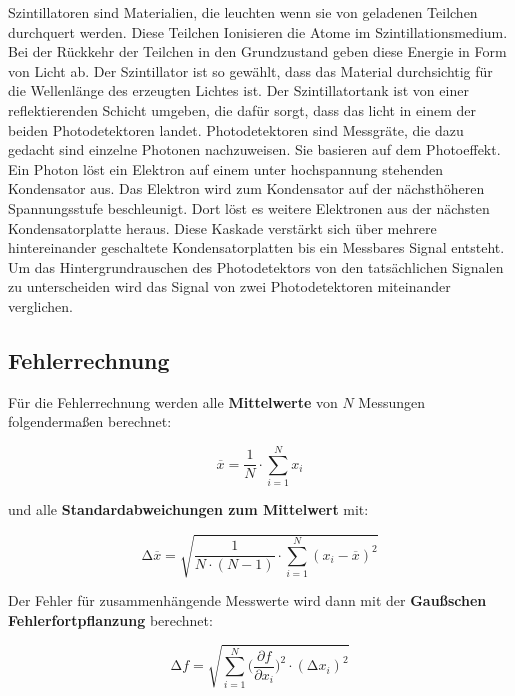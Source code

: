 Szintillatoren sind Materialien, die leuchten wenn sie von geladenen Teilchen durchquert werden.
Diese Teilchen Ionisieren die Atome im Szintillationsmedium. Bei der Rückkehr der Teilchen in den
Grundzustand geben diese Energie in Form von Licht ab. Der Szintillator ist so gewählt, dass das
Material durchsichtig für die Wellenlänge des erzeugten Lichtes ist.
Der Szintillatortank ist von einer reflektierenden Schicht umgeben, die dafür sorgt, dass das licht in
einem der beiden Photodetektoren landet.
Photodetektoren sind Messgräte, die dazu gedacht sind einzelne Photonen nachzuweisen.
Sie basieren auf dem Photoeffekt. Ein Photon löst ein Elektron auf einem unter hochspannung stehenden Kondensator aus.
Das Elektron wird zum Kondensator auf der nächsthöheren Spannungsstufe beschleunigt. Dort löst es weitere Elektronen
aus der nächsten Kondensatorplatte heraus. Diese Kaskade verstärkt sich über mehrere hintereinander geschaltete Kondensatorplatten
bis ein Messbares Signal entsteht. 
Um das Hintergrundrauschen des Photodetektors von den tatsächlichen Signalen zu unterscheiden wird das Signal von zwei Photodetektoren
miteinander verglichen.


\subsection{Fehlerrechnung}
Für die Fehlerrechnung werden alle \textbf{Mittelwerte} von $N$ Messungen folgendermaßen berechnet:

\begin{equation}
	\overline{x} = \frac{1}{N} \cdot \sum_{i=1}^N x_i
	\label{eqn:Mittelwert}
\end{equation}

und alle \textbf{Standardabweichungen zum Mittelwert} mit:

\begin{equation}
	\increment\overline{x} = \sqrt{\frac{1}{N\cdot(N-1)}\cdot\sum_{i=1}^N (x_i-\overline{x})^2}
	\label{eqn:St_Mittelwert}
\end{equation}

Der Fehler für zusammenhängende Messwerte wird dann mit der \textbf{Gaußschen Fehlerfortpflanzung} berechnet:

\begin{equation}
	\increment{f} = \sqrt{ \sum_{i = 1}^{N}  \biggl(\frac{\partial{f}}{\partial{x_i}}\biggr)^2\cdot(\increment{x_i})^2}
	\label{eqn:Gauss}
\end{equation}


